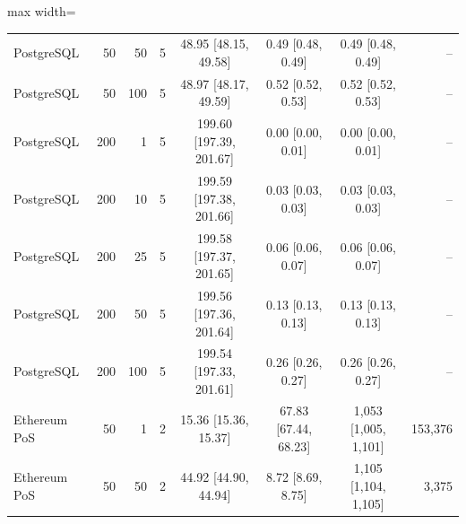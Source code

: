\begin{table}[t]
\begin{adjustbox}{max width=\textwidth}
\begin{tabular}{lrrrcccr}
PostgreSQL & 50 & 50 & 5 & 48.95 [48.15, 49.58] & 0.49 [0.48, 0.49] & 0.49 [0.48, 0.49] & -- \\
PostgreSQL & 50 & 100 & 5 & 48.97 [48.17, 49.59] & 0.52 [0.52, 0.53] & 0.52 [0.52, 0.53] & -- \\
PostgreSQL & 200 & 1 & 5 & 199.60 [197.39, 201.67] & 0.00 [0.00, 0.01] & 0.00 [0.00, 0.01] & -- \\
PostgreSQL & 200 & 10 & 5 & 199.59 [197.38, 201.66] & 0.03 [0.03, 0.03] & 0.03 [0.03, 0.03] & -- \\
PostgreSQL & 200 & 25 & 5 & 199.58 [197.37, 201.65] & 0.06 [0.06, 0.07] & 0.06 [0.06, 0.07] & -- \\
PostgreSQL & 200 & 50 & 5 & 199.56 [197.36, 201.64] & 0.13 [0.13, 0.13] & 0.13 [0.13, 0.13] & -- \\
PostgreSQL & 200 & 100 & 5 & 199.54 [197.33, 201.61] & 0.26 [0.26, 0.27] & 0.26 [0.26, 0.27] & -- \\
Ethereum PoS & 50 & 1 & 2 & 15.36 [15.36, 15.37] & 67.83 [67.44, 68.23] & 1,053 [1,005, 1,101] & 153,376 \\
Ethereum PoS & 50 & 50 & 2 & 44.92 [44.90, 44.94] & 8.72 [8.69, 8.75] & 1,105 [1,104, 1,105] & 3,375 \\
\bottomrule
\end{tabular}\end{adjustbox}
\end{table}
